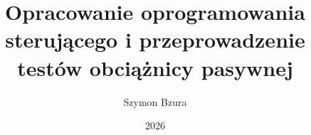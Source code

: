 \documentclass[thesis=inz,faculty=ee]{EE-dyplom}
\title{Opracowanie oprogramowania sterującego i przeprowadzenie testów obciążnicy pasywnej}
\author{Szymon Bzura}
\date{2026}
\begin{document}
    \frontpages
    

	
	
	
	
	
	
	
	

    \bibliografia

    
    \acronymslist
    \listoffigures
    \listoftables
\end{document}
